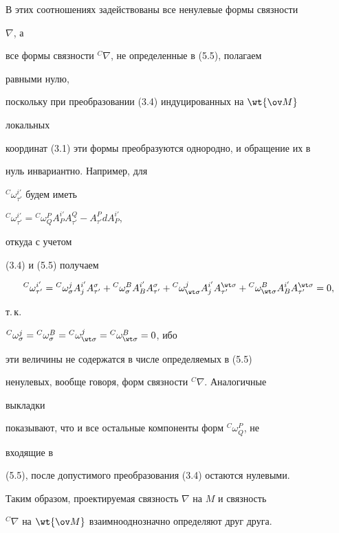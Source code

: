 В этих соотношениях задействованы все ненулевые формы связности


$\nabla$, а


все формы связности ${}^C\nabla$, не определенные в (5.5), полагаем


равными нулю,


поскольку при преобразовании (3.4) индуцированных на $\wt{\ov M}$


локальных


координат (3.1) эти формы преобразуются однородно, и обращение их в


нуль инвариантно. Например, для


${}^C\omega^{i'}_{\tau'}$ будем иметь


${}^C\omega^{i'}_{\tau'}={}^C\omega^P_Q A^{i'}_P A^Q_{\tau'}-


A^P_{\tau'}d A^{i'}_P$,


откуда с учетом


(3.4) и (5.5) получаем


$$


{}^C\omega^{i'}_{\tau'}={}^C\omega^j_\sigma A^{i'}_j


A^\sigma_{\tau'}+{}^C\omega^B_\sigma A^{i'}_B


A^\sigma_{\tau'}+{}^C\omega^j_{\wt\sigma}A^{i'}_j


A^{\wt\sigma}_{\tau'}+{}^C\omega^B_{\wt\sigma}


A^{i'}_B A^{\wt\sigma}_{\tau'}=0,


$$


т.\,к.


${}^C\omega^j_\sigma={}^C\omega^B_\sigma={}^C\omega^j_{\wt\sigma}=


{}^C\omega^B_{\wt\sigma}=0$, ибо


эти величины не содержатся в числе определяемых в (5.5)


ненулевых, вообще говоря, форм связности ${}^C\nabla$. Аналогичные


выкладки


показывают, что и все остальные компоненты форм ${}^C\omega^P_Q$, не


входящие в


(5.5), после допустимого преобразования (3.4) остаются нулевыми.





Таким образом, проектируемая связность $\nabla$ на $M$ и связность


${}^C\nabla$ на $\wt{\ov M}$ взаимнооднозначно определяют друг друга.





